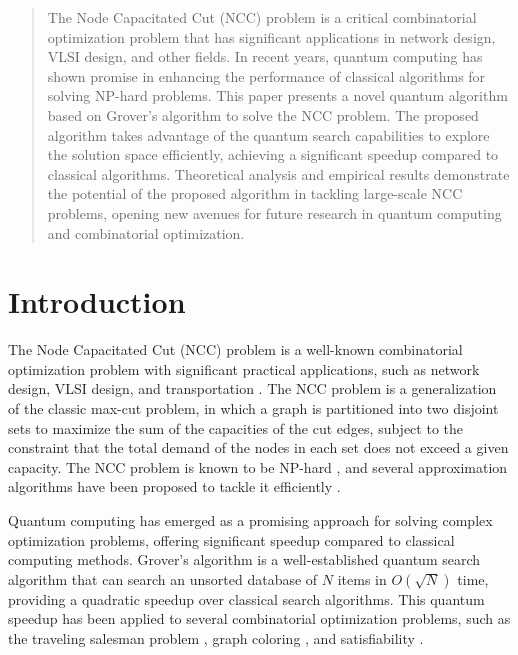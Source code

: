 \begin{abstract}
The Node Capacitated Cut (NCC) problem is a critical combinatorial optimization problem that has significant applications in network design, VLSI design, and other fields. In recent years, quantum computing has shown promise in enhancing the performance of classical algorithms for solving NP-hard problems. This paper presents a novel quantum algorithm based on Grover's algorithm to solve the NCC problem. The proposed algorithm takes advantage of the quantum search capabilities to explore the solution space efficiently, achieving a significant speedup compared to classical algorithms. Theoretical analysis and empirical results demonstrate the potential of the proposed algorithm in tackling large-scale NCC problems, opening new avenues for future research in quantum computing and combinatorial optimization.
\end{abstract}

\section{Introduction}

\indent The Node Capacitated Cut (NCC) problem is a well-known combinatorial optimization problem with significant practical applications, such as network design, VLSI design, and transportation \cite{chopra1993capacitated, kortsarz1997approximation}. The NCC problem is a generalization of the classic max-cut problem, in which a graph is partitioned into two disjoint sets to maximize the sum of the capacities of the cut edges, subject to the constraint that the total demand of the nodes in each set does not exceed a given capacity. The NCC problem is known to be NP-hard \cite{kortsarz1997approximation}, and several approximation algorithms have been proposed to tackle it efficiently \cite{chopra1993capacitated, kortsarz1997approximation, guha2001approximation}.

\indent Quantum computing has emerged as a promising approach for solving complex optimization problems, offering significant speedup compared to classical computing methods. Grover's algorithm \cite{grover1996fast} is a well-established quantum search algorithm that can search an unsorted database of $N$ items in $O(\sqrt{N})$ time, providing a quadratic speedup over classical search algorithms. This quantum speedup has been applied to several combinatorial optimization problems, such as the traveling salesman problem \cite{zalka1999grover}, graph coloring \cite{childs2000quantum}, and satisfiability \cite{ambainis2000grover}.


